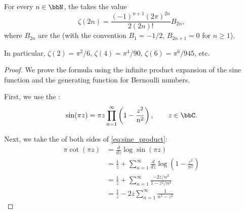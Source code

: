 \begin{corollary} \label{corollary:values_of_riemann_zeta_at_even_positive_integers}
For every $n \in \bbN$, the  takes the value
$$
\boxed{ \zeta(2n) = \frac{(-1)^{n+1} (2\pi)^{2n}}{2 (2n)!} B_{2n}, }
$$
where $B_{2n}$ are the  (with the convention $B_1 = -1/2$, $B_{2n+1} = 0$ for $n \ge 1$).

In particular, $\zeta(2) = \pi^2/6$, $\zeta(4) = \pi^4/90$, $\zeta(6) = \pi^6/945$, etc.

\begin{proof}

We prove the formula using the infinite product expansion of the sine function and the generating function for Bernoulli numbers.

First, we use the :
\begin{equation} \label{eq:sine_product}
\sin(\pi z) = \pi z \prod_{n=1}^\infty \left( 1 - \frac{z^2}{n^2} \right), \qquad z \in \bbC.
\end{equation}

Next, we take the  of both sides of \eqref{eq:sine_product}:
\begin{align*}
\pi \cot(\pi z) &= \frac{d}{dz} \log \sin(\pi z) \\
&= \frac{1}{z} + \sum_{n=1}^\infty \frac{d}{dz} \log \left( 1 - \frac{z^2}{n^2} \right) \\
&= \frac{1}{z} + \sum_{n=1}^\infty \frac{-2z/n^2}{1 - z^2/n^2} \\
&= \frac{1}{z} - 2z \sum_{n=1}^\infty \frac{1}{n^2 - z^2}
\end{align*}


\end{proof}
\end{corollary}
